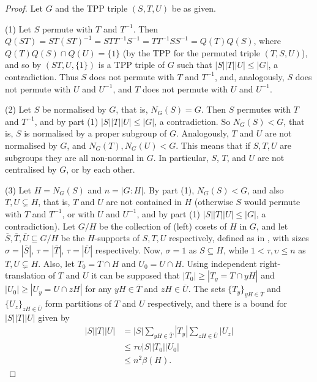 \documentclass{amsart}
\theoremstyle{observation}
\theoremstyle{definition}
\theoremstyle{remark}
\numberwithin{equation}{section}
\begin{document}
\begin{proof}Let $G$ and the TPP triple $(S, T, U)$ be as given.

\textup{(1)} Let $S$ permute with $T$ and $T^{-1}$. Then $Q(ST) = ST(ST)^{-1} = STT^{-1}S^{-1} = TT^{-1}SS^{-1} = Q(T)Q(S)$, where $Q(T)Q(S) \cap Q(U) = \{1\}$ (by the TPP for the permuted triple $(T, S, U)$), and so by \citep[Lemma 3.1]{CU} $(ST, U, \{1\})$ is a TPP triple of $G$ such that $|S||T||U| \leq |G|$, a contradiction. Thus $S$ does not permute with $T$ and $T^{-1}$, and, analogously, $S$ does not permute with $U$ and $U^{-1}$, and $T$ does not permute with $U$ and $U^{-1}$.

\vspace{1mm}

\textup{(2)} Let $S$ be normalised by $G$, that is, $N_G(S) = G$. Then $S$ permutes with $T$ and $T^{-1}$, and by part \textup{(1)} $|S||T||U| \leq |G|$, a contradiction. So $N_G(S) < G$, that is, $S$ is normalised by a proper subgroup of $G$. Analogously, $T$ and $U$ are not normalised by $G$, and $N_G(T), N_G(U) < G$. This means that if $S, T, U$ are subgroups they are all non-normal in $G$. In particular, $S$, $T$, and $U$ are not centralised by $G$, or by each other.

\vspace{1mm}

\textup{(3)} Let $H = N_G(S)$ and $n = |G:H|$. By part \textup{(1)}, $N_G(S) < G$, and also $T, U \subsetneq H$, that is, $T$ and $U$ are not contained in $H$ (otherwise $S$ would permute with $T$ and $T^{-1}$, or with $U$ and $U^{-1}$, and by part \textup{(1)} $|S||T||U| \leq |G|$, a contradiction).  Let $G/H$ be the collection of (left) cosets of $H$ in $G$, and let $\overline{S}, \overline{T}, \overline{U} \subseteq G/H$ be the $H$-supports of $S, T, U$ respectively, defined as in \citep[Definition 3.1]{Mur}, with sizes $\sigma = |\overline{S}|$, $\tau = |\overline{T}|$, $\tau = |\overline{U}|$ respectively. Now, $\sigma = 1$ as $S \subseteq H$, while $1 < \tau, \upsilon \leq n$ as $T, U \subsetneq H$. Also, let $T_0 = T \cap H$ and $U_0 = U \cap H$. Using independent right-translation of $T$ and $U$ \citep[Observation 4.1]{Neu2011} it can be supposed that $|T_0| \geq |T_y = T \cap yH|$ and $|U_0| \geq |U_y = U \cap zH|$ for any $yH \in \overline{T}$ and $zH \in \overline{U}$. The sets $\{T_y\}_{yH \in \overline{T}}$ and $\{U_z\}_{zH \in \overline{U}}$ form partitions of $T$ and $U$ respectively, and there is a bound for $|S||T||U|$ given by
\begin{align*}|S||T||U| &= |S|\sum_{yH \in \overline{T}}|T_y|\sum_{zH \in \overline{U}}|U_z| \\
                        &\leq \tau\upsilon|S||T_0||U_0| \\
                        &\leq n^2\beta(H).
\end{align*}


\end{proof}
\end{document}
